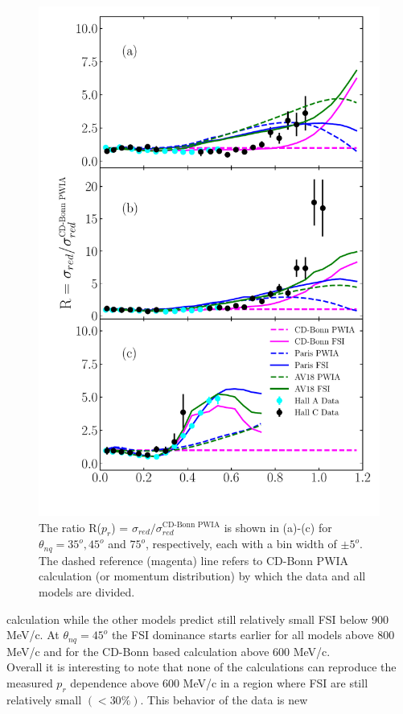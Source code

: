 \begin{figure}[t!]
\includegraphics[scale=0.5]{./prl_plots/PRL_plot2.pdf}
\caption{The ratio R($p_{r}$) = $\sigma_{red}/\sigma^{{\text{CD-Bonn PWIA}}}_{red}$ is shown in (a)-(c) for $\theta_{nq}=35^{o}, 45^{o}$ and $75^{o}$, respectively, each with a bin width of $\pm 5^{o}$.
The dashed reference (magenta) line refers to CD-Bonn PWIA calculation (or momentum distribution) by which the data and all models are divided.}
\label{fig:fig2}
\end{figure}
calculation while the other models predict still relatively small FSI below 900 MeV/c.
At $\theta_{nq}=45^{o}$ the FSI dominance starts earlier for all models above 800 MeV/c and for the CD-Bonn based calculation above 600 MeV/c. \\
\indent Overall it is interesting to note that none of the calculations can reproduce the measured $p_r$ dependence above 600 MeV/c in a region where FSI are still relatively small $(<30\%)$.  This behavior of the data is new
